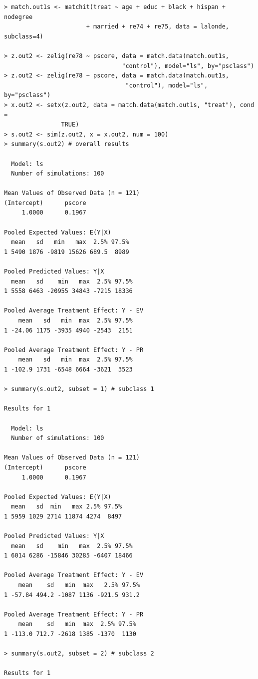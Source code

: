\documentclass[oneside,letterpaper,titlepage]{article}
\begin{document}
\begin{verbatim}
> match.out1s <- matchit(treat ~ age + educ + black + hispan + nodegree
                       + married + re74 + re75, data = lalonde, subclass=4)

> z.out2 <- zelig(re78 ~ pscore, data = match.data(match.out1s,
                                 "control"), model="ls", by="psclass")
> z.out2 <- zelig(re78 ~ pscore, data = match.data(match.out1s,
                                  "control"), model="ls", by="psclass")
> x.out2 <- setx(z.out2, data = match.data(match.out1s, "treat"), cond =
                TRUE)
> s.out2 <- sim(z.out2, x = x.out2, num = 100)
> summary(s.out2) # overall results

  Model: ls 
  Number of simulations: 100 

Mean Values of Observed Data (n = 121) 
(Intercept)      pscore 
     1.0000      0.1967 

Pooled Expected Values: E(Y|X)
  mean   sd   min   max  2.5% 97.5%
1 5490 1876 -9819 15626 689.5  8989

Pooled Predicted Values: Y|X
  mean   sd    min   max  2.5% 97.5%
1 5558 6463 -20955 34843 -7215 18336

Pooled Average Treatment Effect: Y - EV
    mean   sd   min  max  2.5% 97.5%
1 -24.06 1175 -3935 4940 -2543  2151

Pooled Average Treatment Effect: Y - PR
    mean   sd   min  max  2.5% 97.5%
1 -102.9 1731 -6548 6664 -3621  3523

> summary(s.out2, subset = 1) # subclass 1

Results for 1 

  Model: ls 
  Number of simulations: 100 

Mean Values of Observed Data (n = 121) 
(Intercept)      pscore 
     1.0000      0.1967 

Pooled Expected Values: E(Y|X)
  mean   sd  min   max 2.5% 97.5%
1 5959 1029 2714 11874 4274  8497

Pooled Predicted Values: Y|X
  mean   sd    min   max  2.5% 97.5%
1 6014 6286 -15846 30285 -6407 18466

Pooled Average Treatment Effect: Y - EV
    mean    sd   min  max   2.5% 97.5%
1 -57.84 494.2 -1087 1136 -921.5 931.2

Pooled Average Treatment Effect: Y - PR
    mean    sd   min  max  2.5% 97.5%
1 -113.0 712.7 -2618 1385 -1370  1130

> summary(s.out2, subset = 2) # subclass 2

Results for 1 


\end{verbatim}
\end{document}

